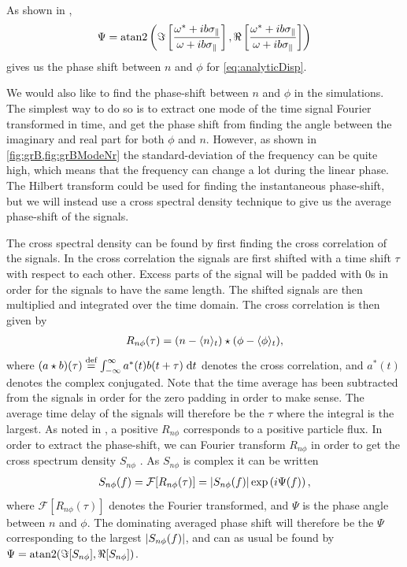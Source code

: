 As shown in \cite{Pecseli2016book},
%
\begin{align}
    \Psi = \text{atan}2\left(
    \Im\left[\frac{\omega^*+ib\sigma_\|}{\omega+ib\sigma_\|}\right],
    \Re\left[\frac{\omega^*+ib\sigma_\|}{\omega+ib\sigma_\|}\right]
    \right)
    \label{eq:analPhase}
\end{align}
%
gives us the phase shift between $n$ and $\phi$ for \cref{eq:analyticDisp}.

We would also like to find the phase-shift between $n$ and $\phi$ in the simulations.
The simplest way to do so is to extract one mode of the time signal Fourier transformed in time, and get the phase shift from finding the angle between the imaginary and real part for both $\phi$ and $n$.
However, as shown in \cref{fig:grB,fig:grBModeNr} the standard-deviation of the frequency can be quite high, which means that the frequency can change a lot during the linear phase.
The Hilbert transform could be used for finding the instantaneous phase-shift, but we will instead use a cross spectral density technique to give us the average phase-shift of the signals.

The cross spectral density can be found by first finding the cross correlation of the signals.
In the cross correlation the signals are first shifted with a time shift $\tau$ with respect to each other.
Excess parts of the signal will be padded with $0$s in order for the signals to have the same length.
The shifted signals are then multiplied and integrated over the time domain.
The cross correlation is then given by
%
\begin{align*}
    R_{n\phi}(\tau) = (n-\langle{n}\rangle_t) \star (\phi-\langle{\phi}\rangle_t),
\end{align*}
%
where $(a \star b)(\tau) \overset{\text{def}}{=} \int_{-\infty }^{\infty} {a^{*}(t) b(t+\tau )} \; \text{d} {t}$ denotes the cross correlation, and $a^*(t)$ denotes the complex conjugated.
Note that the time average has been subtracted from the signals in order for the zero padding in order to make sense.
The average time delay of the signals will therefore be the $\tau$ where the integral is the largest.
As noted in \cite{Huld1988}, a positive $R_{n\phi}$ corresponds to a positive particle flux.
In order to extract the phase-shift, we can Fourier transform $R_{n\phi}$ in order to get the cross spectrum density $S_{n\phi}$ .
As $S_{n\phi}$ is complex it can be written
%
\begin{align*}
    S_{n\phi}(f) = \mathcal{F}[R_{n\phi}(\tau)] = \left|S_{n\phi}(f)\right|\exp\left(i\Psi(f)\right),
\end{align*}
%
where $\mathcal{F}[R_{n\phi}(\tau)]$ denotes the Fourier transformed, and $\Psi$ is the phase angle between $n$ and $\phi$.
The dominating averaged phase shift will therefore be the $\Psi$ corresponding to the largest $\left|S_{n\phi}(f)\right|$, and can as usual be found by $\Psi = \text{atan}2(\Im[S_{n\phi}], \Re[S_{n\phi}])$.

